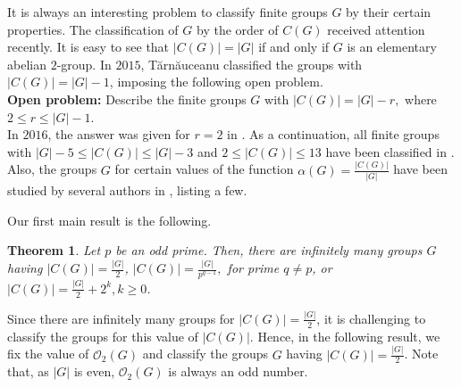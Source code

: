 \documentclass[a4paper,11pt]{amsart}
\numberwithin{equation}{section}
\numberwithin{equation}{subsection}
\newtheorem{theorem}{Theorem}[section]
\begin{document}


It is always an interesting problem to classify finite groups $G$ by their certain properties. The classification of $G$ by the order of $C(G)$  received attention recently. It is easy to see that $|C(G)|= |G|$ if and only if $G$ is an elementary abelian $2$-group.
In $2015$, Tărnăuceanu \cite{MT} classified the groups with $|C(G)|=|G|-1$, imposing the following open problem.\\

\noindent \textbf{Open problem:} Describe the finite groups $G$ with $|C(G)| = |G|-r,$ where $2 \leq r \leq |G|-1$.\\

In $2016$, the answer was given for $r=2$ in \cite{MT1}. As a continuation, all finite groups with $|G|-5\leq |C(G)|\leq |G|-3$ and $2\leq|C(G)|\leq 13$ have been classified in \cite{AA,AA1,RJL,  LCQ,SR,SR1}. 
Also, the groups $G$ for certain values of the function $\alpha(G)=\frac{|C(G)|}{|G|}$ have been  studied by several authors in \cite{GS,GL,ML}, listing a few. 



Our first main result is the following. 
\begin{theorem}\label{mainresult}
Let $p$ be an odd prime. Then, there are infinitely many groups $G$ having $|C(G)|= \frac{|G|}{2}$,  $|C(G)|=\frac{|G|}{p^{q-1}},$ for prime $q\neq p$,  or $|C(G)|=\frac{|G|}{2}+2^{k},  k\geq 0$. 
 \end{theorem}



%
%

Since there are infinitely many groups for $|C(G)|=\frac{|G|}{2}$, it is challenging  to classify the groups for this value of $|C(G)|$. Hence, in the following result, we fix the value of $\mathcal{O}_{2}(G)$ and classify the groups $G$ having $|C(G)|=\frac{|G|}{2}$. Note that, as $|G|$ is even, $\mathcal{O}_{2}(G)$ is always an odd number.
\end{document}
